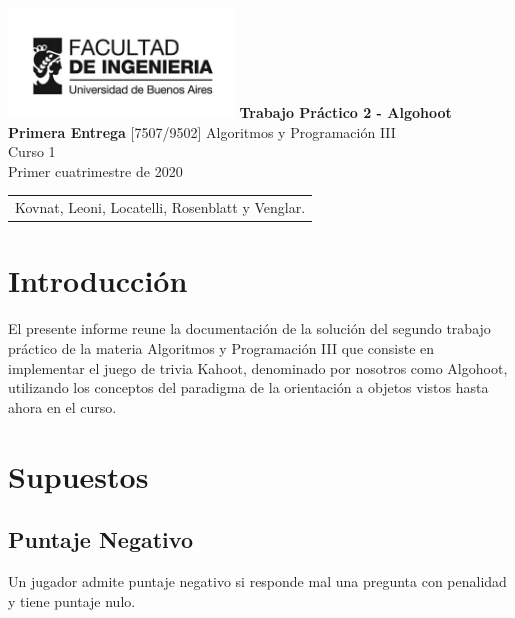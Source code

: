 \documentclass[titlepage,a4paper]{article}
\begin{document}
\begin{titlepage} %
	\hfill\includegraphics[width=6cm]{img/logofiuba.jpg}
    \centering
    \vfill
    \Huge \textbf{Trabajo Práctico 2 - Algohoot\\ Primera Entrega}
    \vskip2cm
    \Large [7507/9502] Algoritmos y Programación III\\
    Curso 1\\ %
    Primer cuatrimestre de 2020 
    \vfill
    \begin{tabular}{  l  } %
      Kovnat, Leoni, Locatelli, Rosenblatt y Venglar. %
  	\end{tabular}
    \vfill
    \vfill
\end{titlepage}

\tableofcontents %
\newpage

\section{Introducción}\label{sec:intro}
El presente informe reune la documentación de la solución del segundo trabajo práctico de la materia Algoritmos y Programación III que consiste en implementar el juego de trivia Kahoot, denominado por nosotros como Algohoot, utilizando los conceptos del paradigma de la orientación a objetos vistos hasta ahora en el curso.

\section{Supuestos}\label{sec:supuestos}

\subsection{Puntaje Negativo}

Un jugador admite puntaje negativo si responde mal una pregunta con penalidad y tiene puntaje nulo. 
\end{document}
